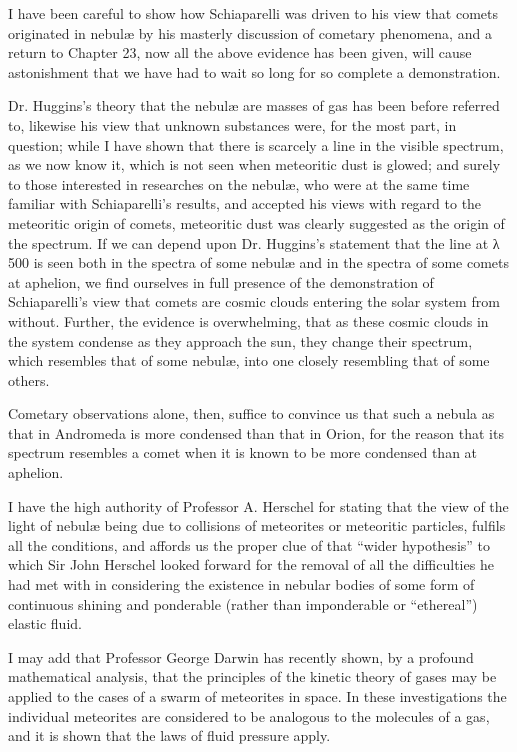 \documentclass[a4paper, 12pt, oneside, polutonikogreek, english]{article}
\begin{document}
I have been careful to show how Schiaparelli was driven to his view that comets originated in nebulæ by his masterly discussion of cometary phenomena, and a return to Chapter 23, now all the above evidence has been given, will cause astonishment that we have had to wait so long for so complete a demonstration.

Dr. Huggins's theory that the nebulæ are masses of gas has been before referred to, likewise his view that unknown substances were, for the most part, in question; while I have shown that there is scarcely a line in the visible spectrum, as we now know it, which is not seen when meteoritic dust is glowed; and surely to those interested in researches on the nebulæ, who were at the same time familiar with Schiaparelli's results, and accepted his views with regard to the meteoritic origin of comets, meteoritic dust was clearly suggested as the origin of the spectrum. If we can depend upon Dr. Huggins's statement that the line at λ 500 is seen both in the spectra of some nebulæ and in the spectra of some comets at aphelion, we find ourselves in full presence of the demonstration of Schiaparelli's view that comets are cosmic clouds entering the solar system from without. Further, the evidence is overwhelming, that as these cosmic clouds in the system condense as they approach the sun, they change their spectrum, which resembles that of some nebulæ, into one closely resembling that of some others.

Cometary observations alone, then, suffice to convince us that such a nebula as that in Andromeda is more condensed than that in Orion, for the reason that its spectrum resembles a comet when it is known to be more condensed than at aphelion.

I have the high authority of Professor A. Herschel for stating that the view of the light of nebulæ being due to collisions of meteorites or meteoritic particles, fulfils all the conditions, and affords us the proper clue of that ``wider hypothesis'' to which Sir John Herschel looked forward for the removal of all the difficulties he had met with in considering the existence in nebular bodies of some form of continuous shining and ponderable (rather than imponderable or ``ethereal'') elastic fluid.

I may add that Professor George Darwin has recently shown, by a profound mathematical analysis, that the principles of the kinetic theory of gases may be applied to the cases of a swarm of meteorites in space. In these investigations the individual meteorites are considered to be analogous to the molecules of a gas, and it is shown that the laws of fluid pressure apply.
\end{document}
